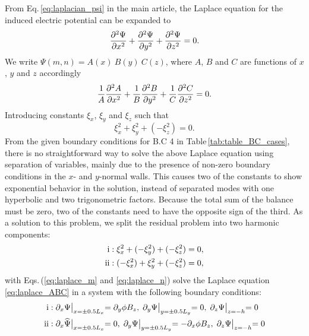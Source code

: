 \documentclass[aps,prfluids,reprint,superscriptaddress]{revtex4-2}
\newcommand{\RN}[1]{%
	\textup{\uppercase\expandafter{\romannumeral#1}}%
}
\newcommand{\meqref}[1]{{\hypersetup{linkcolor=black}\eqref{#1}}}
\numberwithin{equation}{section}
\begin{document}
From Eq.\,\meqref{eq:laplacian_psi} in the main article, the Laplace equation for the induced electric potential can be expanded to
\begin{gather}
	\pdv[2]{{\Psi}}{x} + \pdv[2]{{\Psi}}{y}
	+ \pdv[2]{{\Psi}}{z}= 0 .
\end{gather}
We write $\Psi(m,n) = A(x) \: B(y) \: C(z)$, where $A$, $B$ and $C$ are functions of $x$, $y$ and $z$ accordingly
\begin{equation}
	\dfrac{1}{A} \dpdv[2]{A}{x}  + \dfrac{1}{B} \dpdv[2]{B}{y} 
	+ \dfrac{1}{C} \dpdv[2]{C}{z} = 0.
	\label{eq:laplace_ABC}
\end{equation}
Introducing constants $\xi_x$, $\xi_y$ and $\xi_z$ such that
\begin{equation}
	\xi_x^2 + \xi_y^2 + (-\xi_z^2) = 0 .
\end{equation}
From the given boundary conditions for B.C 4 in Table\,\ref{tab:table_BC_cases}, there is no straightforward way to solve the above Laplace equation using separation of variables, mainly due to the presence of non-zero boundary conditions in the $x$- and $y$-normal walls. This causes two of the constants to show exponential behavior in the solution, instead of separated modes with one hyperbolic and two trigonometric factors. Because the total sum of the balance must be zero, two of the constants need to have the opposite sign of the third. As a solution to this problem, we split the
residual problem into two harmonic components:
\begin{subequations}
	\begin{align}
	\RN{1} : \xi_x^2 + (-\xi_y^2) + (-\xi_z^2) = 0,
	\label{eq:laplace_m} 
	\\
	\RN{2} : (-\xi_x^2) + \xi_y^2 + (-\xi_z^2) = 0,
	\label{eq:laplace_n} 
	\end{align}
\end{subequations}
with Eqs.\,(\ref{eq:laplace_m} and \ref{eq:laplace_n}) solve the Laplace equation \eqref{eq:laplace_ABC} in a system with the following boundary conditions:
\begin{subequations}
	\begin{align}
		\RN{1} &: \partial_x \Psi\bigl|_{x=\pm 0.5L_x} = \partial_y\phi B_z,\;
		\partial_y \Psi\bigl|_{y=\pm 0.5L_y}= 0, \;
		\partial_z\Psi\bigl|_{z=-h}=0
		\label{eq:bc_m} 
		\\
		\RN{2} &: \partial_x \widehat\Psi\bigl|_{x=\pm 0.5L_x} = 0, \;
		\partial_y \Psi\bigl|_{y=\pm 0.5L_y}= -\partial_x\phi B_z,\;
		\partial_z\Psi\bigl|_{z=-h}=0
		\label{eq:bc_n} 
	\end{align}
\end{subequations}
\end{document}
